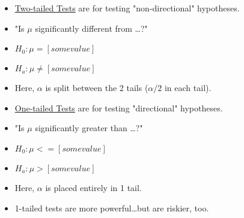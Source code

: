\documentclass[11pt]{report}
\begin{document}
\begin{multicols}{2}
    \begin{itemize}
        \item \underline{Two-tailed Tests} are for testing "non-directional" hypotheses.
        \item "Is $\mu$ significantly different from \dots?"
        \item $H_0: \mu = [some value]$
        \item $H_a: \mu \neq [some value]$
        \item Here, $\alpha$ is split between the 2 tails ($\alpha/2$ in each tail).
    \end{itemize}
    \columnbreak    
    \begin{itemize}
        \item \underline{One-tailed Tests} are for testing "directional" hypotheses.
        \item "Is $\mu$ significantly greater than \dots?"
        \item $H_0: \mu <= [some value]$
        \item $H_a: \mu > [some value]$
        \item Here, $\alpha$ is placed entirely in 1 tail.
        \item 1-tailed tests are more powerful\dots but are riskier, too.
    \end{itemize}
\end{multicols}
\end{document}
